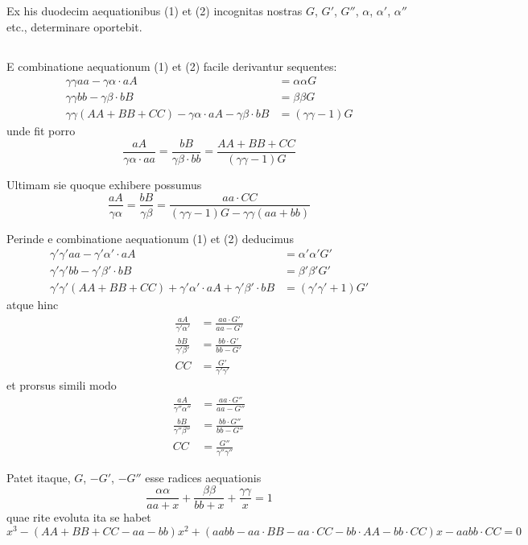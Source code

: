 \documentclass[12pt,a4paper]{article}
\begin{document}
Ex his duodecim aequationibus (1) et (2) incognitas nostras $G$, $G'$, $G''$, $\alpha$, $\alpha'$, $\alpha''$ etc., determinare oportebit.

\setcounter{subsection}{4}
\subsection{}

E combinatione aequationum (1) et (2) facile derivantur sequentes:
\[
\begin{aligned}
\gamma\gamma aa - \gamma\alpha\cdot aA &= \alpha\alpha G \\
\gamma\gamma bb - \gamma\beta\cdot bB &= \beta\beta G \\
\gamma\gamma(AA+BB+CC) - \gamma\alpha\cdot aA - \gamma\beta\cdot bB &= (\gamma\gamma-1)G
\end{aligned}
\tag{3}
\]
unde fit porro
\[
\frac{aA}{\gamma\alpha\cdot aa} = \frac{bB}{\gamma\beta\cdot bb}
= \frac{AA+BB+CC}{(\gamma\gamma-1)G}
\]

Ultimam sie quoque exhibere possumus
\[
\frac{aA}{\gamma\alpha} = \frac{bB}{\gamma\beta} = \frac{aa\cdot CC}{(\gamma\gamma-1)G - \gamma\gamma(aa+bb)}
\]

Perinde e combinatione aequationum (1) et (2) deducimus
\[
\begin{aligned}
\gamma'\gamma' aa - \gamma'\alpha'\cdot aA &= \alpha'\alpha' G' \\
\gamma'\gamma' bb - \gamma'\beta'\cdot bB &= \beta'\beta' G' \\
\gamma'\gamma'(AA+BB+CC) + \gamma'\alpha'\cdot aA + \gamma'\beta'\cdot bB &= (\gamma'\gamma'+1)G'
\end{aligned}
\]
atque hinc
\[
\begin{aligned}
\frac{aA}{\gamma'\alpha'} &= \frac{aa\cdot G'}{aa-G'} \\
\frac{bB}{\gamma'\beta'} &= \frac{bb\cdot G'}{bb-G'} \\
CC &= \frac{G'}{\gamma'\gamma'}
\end{aligned}
\tag{8}
\]
et prorsus simili modo
\[
\begin{aligned}
\frac{aA}{\gamma''\alpha''} &= \frac{aa\cdot G''}{aa-G''} \\
\frac{bB}{\gamma''\beta''} &= \frac{bb\cdot G''}{bb-G''} \\
CC &= \frac{G''}{\gamma''\gamma''}
\end{aligned}
\tag{10}
\]

Patet itaque, $G$, $-G'$, $-G''$ esse radices aequationis
\[
\frac{\alpha\alpha}{aa+x} + \frac{\beta\beta}{bb+x} + \frac{\gamma\gamma}{x} = 1
\tag{12}
\]
quae rite evoluta ita se habet
\[
x^3 - (AA+BB+CC-aa-bb)x^2
+ (aabb - aa\cdot BB - aa\cdot CC - bb\cdot AA - bb\cdot CC)x
- aabb\cdot CC = 0
\tag{13}
\]
\end{document}
